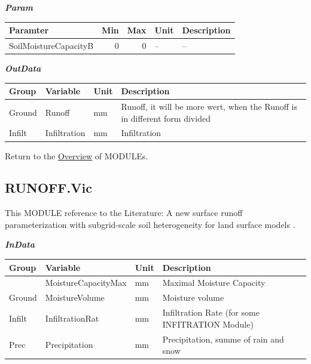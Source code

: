 \documentclass[
]{book}
\begin{document}
\textbf{\emph{Param}}

\begin{table}[!h]
\centering
\begin{tabular}{l|r|r|l|l}
\hline
Paramter & Min & Max & Unit & Description\\
\hline
SoilMoistureCapacityB & 0 & 0 & -- & --\\
\hline
\end{tabular}
\end{table}

\textbf{\emph{OutData}}

\begin{table}[!h]
\centering
\begin{tabular}{l|l|l|l}
\hline
Group & Variable & Unit & Description\\
\hline
Ground & Runoff & mm & Runoff, it will be more wert, when the Runoff is in different form divided\\
\cline{1-4}
Infilt & Infiltration & mm & Infiltration\\
\hline
\end{tabular}
\end{table}

Return to the \protect\hyperlink{module}{Overview} of MODULEs.

\hypertarget{RUNOFF.Vic}{%
\subsection{RUNOFF.Vic}\label{RUNOFF.Vic}}

This MODULE reference to the Literature: A new surface runoff parameterization with subgrid-scale soil heterogeneity for land surface models \citep{Liang.2001}.

\textbf{\emph{InData}}

\begin{table}[!h]
\centering
\begin{tabular}{l|l|l|l}
\hline
Group & Variable & Unit & Description\\
\hline
 & MoistureCapacityMax & mm & Maximal Moisture Capacity\\
\cline{2-4}
\multirow{-2}{*}{\raggedright\arraybackslash Ground} & MoistureVolume & mm & Moisture volume\\
\cline{1-4}
Infilt & InfiltrationRat & mm & Infiltration Rate (for some INFITRATION Module)\\
\cline{1-4}
Prec & Precipitation & mm & Precipitation, summe of rain and snow\\
\hline
\end{tabular}
\end{table}
\end{document}
